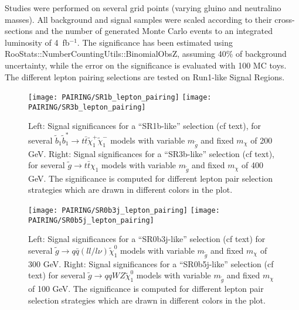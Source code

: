 Studies were performed on several grid points (varying gluino and neutralino masses). 
All background and signal samples were scaled according to their cross-sections and the number of generated Monte Carlo events to an integrated luminosity of 4~fb$^{-1}$. 
The significance has been estimated using RooStats::NumberCountingUtils::BinomialObsZ, assuming 40$\%$ of background uncertainty, while the error on the significance is evaluated with 100 MC toys.\\ 
The different lepton pairing selections are tested on Run1-like Signal Regions.\\
\begin{figure}[!ht]
  \centering
  \texttt{[image: PAIRING/SR1b\_lepton\_pairing]}
  \texttt{[image: PAIRING/SR3b\_lepton\_pairing]}
  \caption{Left: Signal significances for a ``SR1b-like'' selection (cf text),  
  for several $\tilde{b}_{1}\tilde{b}_{1}^{*} \rightarrow t\bar{t}\tilde{\chi}_{1}^{+}\tilde{\chi}_{1}^{-}$ models with variable $m_{\tilde{g}}$ and fixed $m_{\chi}$ of 200 GeV. 
  Right: Signal significances for a ``SR3b-like'' selection (cf text), 
  for several $\tilde{g} \rightarrow t \bar{t} \chi_{1}$ models with variable $m_{\tilde{g}}$ and fixed $m_{\chi}$ of 400 GeV. 
  The significance is computed for different lepton pair selection strategies which are drawn in different colors in the plot.}
 \label{fig:Pairing_SR1b}
\end{figure}

\begin{figure}[!ht]
  \centering
  \texttt{[image: PAIRING/SR0b3j\_lepton\_pairing]}
  \texttt{[image: PAIRING/SR0b5j\_lepton\_pairing]}
  \caption{Left: Signal significances for a ``SR0b3j-like'' selection (cf text) 
  for several $\tilde{g} \rightarrow q\bar{q}(ll/l\nu)\tilde{\chi}_{1}^{0}$ models with variable $m_{\tilde{g}}$ and fixed $m_{\chi}$ of 300 GeV. 
Right: Signal significances for a ``SR0b5j-like'' selection (cf text) 
for several $\tilde{g} \rightarrow qqWZ\tilde{\chi}_{1}^{0}$ models with variable $m_{\tilde{g}}$ and fixed $m_{\chi}$ of 100 GeV. 
The significance is computed for different lepton pair selection strategies which are drawn in different colors in the plot.}
  \label{fig:Pairing_SR0b3j}
\end{figure}

